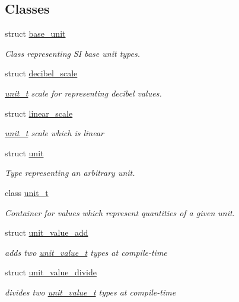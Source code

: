 \subsection*{Classes}
\begin{DoxyCompactItemize}
\item 
struct \hyperlink{structunits_1_1base__unit}{base\+\_\+unit}
\begin{DoxyCompactList}\small\item\em Class representing S\+I base unit types. \end{DoxyCompactList}\item 
struct \hyperlink{structunits_1_1decibel__scale}{decibel\+\_\+scale}
\begin{DoxyCompactList}\small\item\em \hyperlink{classunits_1_1unit__t}{unit\+\_\+t} scale for representing decibel values. \end{DoxyCompactList}\item 
struct \hyperlink{structunits_1_1linear__scale}{linear\+\_\+scale}
\begin{DoxyCompactList}\small\item\em \hyperlink{classunits_1_1unit__t}{unit\+\_\+t} scale which is linear \end{DoxyCompactList}\item 
struct \hyperlink{structunits_1_1unit}{unit}
\begin{DoxyCompactList}\small\item\em Type representing an arbitrary unit. \end{DoxyCompactList}\item 
class \hyperlink{classunits_1_1unit__t}{unit\+\_\+t}
\begin{DoxyCompactList}\small\item\em Container for values which represent quantities of a given unit. \end{DoxyCompactList}\item 
struct \hyperlink{structunits_1_1unit__value__add}{unit\+\_\+value\+\_\+add}
\begin{DoxyCompactList}\small\item\em adds two \hyperlink{structunits_1_1unit__value__t}{unit\+\_\+value\+\_\+t} types at compile-\/time \end{DoxyCompactList}\item 
struct \hyperlink{structunits_1_1unit__value__divide}{unit\+\_\+value\+\_\+divide}
\begin{DoxyCompactList}\small\item\em divides two \hyperlink{structunits_1_1unit__value__t}{unit\+\_\+value\+\_\+t} types at compile-\/time \end{DoxyCompactList}\item 

\end{DoxyCompactItemize}
